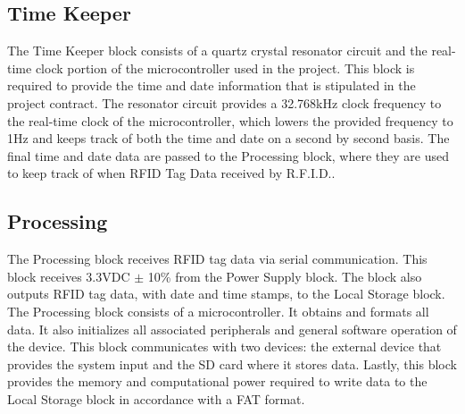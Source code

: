 \subsection{Time Keeper}
The Time Keeper block consists of a quartz crystal resonator circuit and the real-time clock portion of the microcontroller used in the project. This block is required to provide the time and date information that is stipulated in the project contract. The resonator circuit provides a 32.768kHz clock frequency to the real-time clock of the microcontroller, which lowers the provided frequency to 1Hz and keeps track of both the time and date on a second by second basis. The final time and date data are passed to the Processing block, where they are used to keep track of when RFID Tag Data \DIFdelbegin {}\DIFdelend \DIFaddbegin {}\DIFaddend received by R.F.I.D..


\subsection{Processing}
 The Processing block receives RFID tag data via serial communication. This block receives 3.3VDC $\pm$ 10\% from the Power Supply block. The block also outputs RFID tag data, with date and time stamps, to the Local Storage block. The Processing block consists of a microcontroller. It obtains and formats all data. It also initializes all associated peripherals and general software operation of the device. This block communicates with two devices: the external device that provides the system input and the SD card where it stores data. Lastly, this block provides the memory and computational power required to write data to the Local Storage block in accordance with a FAT format.

 
 \DIFdelbegin %

\DIFdelend %




